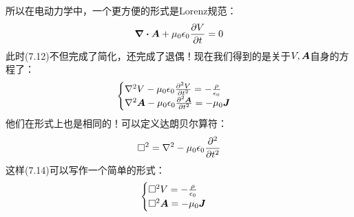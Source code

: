 \documentclass[14pt,oneside]{book}
\def \J{\vb*{J}}
\def \A{\vb*{A}}
\def \laplace{\nabla^2{}}
\begin{document}
\begin{large}
所以在电动力学中，一个更方便的形式是Lorenz规范：
\begin{equation}
  \div\A+\mu_0\epsilon_0\pdv{V}{t}=0
\end{equation}
此时(7.12)不但完成了简化，还完成了退偶！现在我们得到的是关于$V,\A$自身的方程了：
\begin{align}
\begin{cases}
	    \laplace V-\mu_0\epsilon_0\pdv[2]{V}{t}=-\frac{\rho}{\epsilon_0}\\
	    \laplace \A-\mu_0\epsilon_0\pdv[2]{\A}{t}=-\mu_0\J
\end{cases}
\end{align}
他们在形式上也是相同的！可以定义达朗贝尔算符：
\begin{equation}
  \square^2=\laplace -\mu_0\epsilon_0\pdv[2]{}{t}
\end{equation}
这样(7.14)可以写作一个简单的形式：
\begin{align}
\begin{cases}
	  \square^2V=-\frac{\rho}{\epsilon_0}\\
	  \square^2\A=-\mu_0\J
\end{cases}
\end{align}

\end{large}
\end{document}

